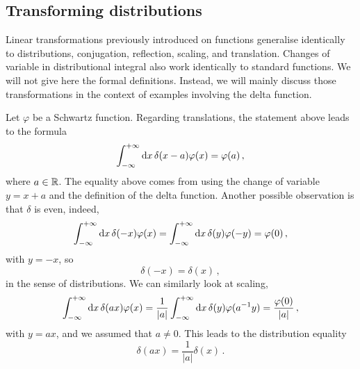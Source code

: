 \subsection{Transforming distributions}
Linear transformations previously introduced on functions generalise identically to
distributions, \ie conjugation, reflection, scaling, and translation. Changes of variable
in distributional integral also work identically to standard functions. We will not give
here the formal definitions. Instead, we will mainly discuss those transformations in the
context of examples involving the delta function.

Let $\varphi$ be a Schwartz function. Regarding translations, the statement above leads to
the formula
\begin{equation}
  \int_{-\infty}^{+\infty}\mathrm{d}{x}\,\delta(x-a)\varphi(x)=\varphi(a)\,,
\end{equation}
where $a\in\mathbb{R}$. The equality above comes from using the change of variable $y=x+a$ and the
definition of the delta function. Another possible observation is that $\delta$ is even,
indeed,
\begin{equation}
  \int_{-\infty}^{+\infty}\mathrm{d}{x}\,\delta(-x)\varphi(x)=\int_{-\infty}^{+\infty}\mathrm{d}{x}\,\delta(y)\varphi(-y)=\varphi(0)\,,
\end{equation}
with $y=-x$, so
\begin{equation}
  \delta(-x)=\delta(x)\,,
\end{equation}
in the sense of distributions. We can similarly look at scaling, \ie
\begin{equation}
  \int_{-\infty}^{+\infty}\mathrm{d}{x}\,\delta(ax)\varphi(x)=\frac{1}{|a|}\int_{-\infty}^{+\infty}\mathrm{d}{x}\,\delta(y)\varphi(a^{-1}y)
  =\frac{\varphi(0)}{|a|}\,,
\end{equation}
with $y=ax$, and we assumed that $a\neq 0$. This leads to the distribution equality
\begin{equation}
  \delta(ax)=\frac{1}{|a|}\delta(x)\,.
\end{equation}

